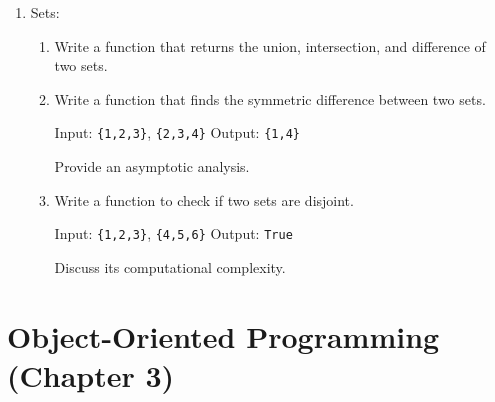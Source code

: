\documentclass{article}
\begin{document}
\begin{enumerate}
    \item Sets:
    
    \begin{enumerate}
        \item Write a function that returns the union, intersection, and difference of two sets.
        \item Write a function that finds the symmetric difference between two sets.
        
        Input: \texttt{\{1,2,3\}}, \texttt{\{2,3,4\}}
        Output: \texttt{\{1,4\}}
        
        Provide an asymptotic analysis.
        
        \item Write a function to check if two sets are disjoint.
        
        Input: \texttt{\{1,2,3\}}, \texttt{\{4,5,6\}}
        Output: \texttt{True}
        
        Discuss its computational complexity.
    \end{enumerate}
\end{enumerate}

\section*{Object-Oriented Programming (Chapter 3)}
\end{document}
